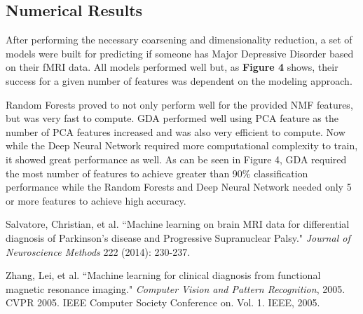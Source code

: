 \documentclass{article}[12pt]
\begin{document}
   
   \subsection{Numerical Results}
   After performing the necessary coarsening and dimensionality reduction, a set of models were built for predicting if someone has Major Depressive Disorder based on their fMRI data.  All models performed well but, as \textbf{Figure 4} shows, their success for a given number of features was dependent on the modeling approach. 
   
   Random Forests proved to not only perform well for the provided NMF features, but was very fast to compute. GDA performed well using PCA feature as the number of PCA features increased and was also very efficient to compute. Now while the Deep Neural Network required more computational complexity to train, it showed great performance as well. As can be seen in Figure 4, GDA required the most number of features to achieve greater than 90\% classification performance while the Random Forests and Deep Neural Network needed only 5 or more features to achieve high accuracy.
   
   \newpage
   \begin{thebibliography}{9}
   	
   	Salvatore, Christian, et al. ``Machine learning on brain MRI data for differential diagnosis of Parkinson's disease and Progressive Supranuclear Palsy." \textit{Journal of Neuroscience Methods} 222 (2014): 230-237.
   	
   	Zhang, Lei, et al. ``Machine learning for clinical diagnosis from functional magnetic resonance imaging." \textit{Computer Vision and Pattern Recognition}, 2005. CVPR 2005. IEEE Computer Society Conference on. Vol. 1. IEEE, 2005.
   \end{thebibliography}
   
   
   
   
   
\end{document}
